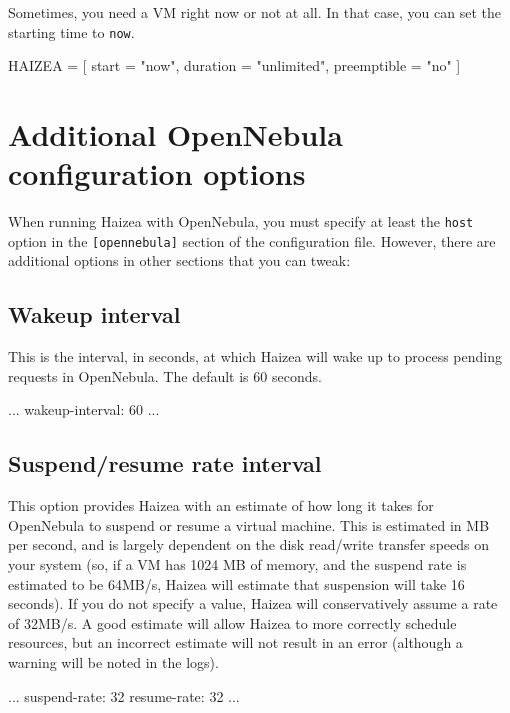 Sometimes, you need a VM right now or not at all. In that case, you can set the starting time to \texttt{now}.

\begin{wideshellverbatim}
HAIZEA = [
  start        = "now",
  duration     = "unlimited",
  preemptible  = "no"
]
\end{wideshellverbatim}

\section{Additional OpenNebula configuration options}

When running Haizea with OpenNebula, you must specify at least the \texttt{host} option in the \texttt{[opennebula]} section of the configuration file. However, there are additional options in other sections that you can tweak:

\subsection{Wakeup interval}

This is the interval, in seconds, at which Haizea will wake up to process pending requests in OpenNebula. The default is 60 seconds.

\begin{wideshellverbatim}
[scheduling]
...
wakeup-interval: 60
...
\end{wideshellverbatim}

\subsection{Suspend/resume rate interval}

This option provides Haizea with an estimate of how long it takes for OpenNebula to suspend or resume a virtual machine. This is estimated in MB per second, and is largely dependent on the disk read/write transfer speeds on your system (so, if a VM has 1024 MB of memory, and the suspend rate is estimated to be 64MB/s, Haizea will estimate that suspension will take 16 seconds). If you do not specify a value, Haizea will conservatively assume a rate of 32MB/s. A good estimate will allow Haizea to more correctly schedule resources, but an incorrect estimate will not result in an error (although a warning will be noted in the logs).

\begin{wideshellverbatim}
[scheduling]
...
suspend-rate: 32
resume-rate: 32
...
\end{wideshellverbatim}


